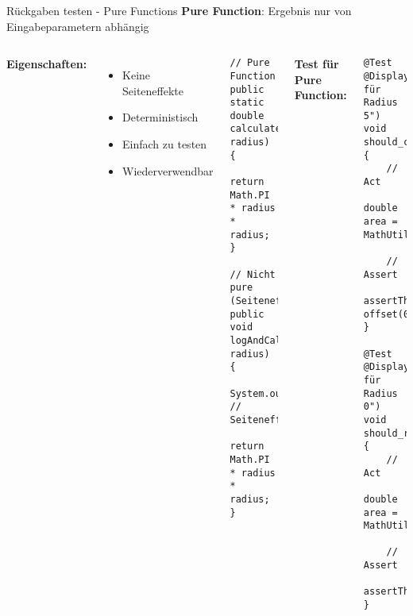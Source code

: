 \begin{frame}[fragile]{Rückgaben testen - Pure Functions}
  \textbf{Pure Function}: Ergebnis nur von Eingabeparametern abhängig

  \begin{columns}[T]
    \textbf{Eigenschaften:}
    \begin{itemize}
      \item Keine Seiteneffekte
      \item Deterministisch
      \item Einfach zu testen
      \item Wiederverwendbar
    \end{itemize}

    \begin{lstlisting}[style=java, basicstyle=\tiny\ttfamily]
// Pure Function
public static double calculateCircleArea(double radius) {
    return Math.PI * radius * radius;
}

// Nicht pure (Seiteneffekt)
public void logAndCalculate(double radius) {
    System.out.println("Calculating...");  // Seiteneffekt!
    return Math.PI * radius * radius;
}
    \end{lstlisting}

    \textbf{Test für Pure Function:}
    \begin{lstlisting}[style=java, basicstyle=\tiny\ttfamily]
@Test
@DisplayName("Kreisfläche für Radius 5")
void should_calculate_circle_area_for_radius_5() {
    // Act
    double area = MathUtils.calculateCircleArea(5.0);

    // Assert
    assertThat(area).isCloseTo(78.54, offset(0.01));
}

@Test
@DisplayName("Kreisfläche für Radius 0")
void should_return_zero_area_for_zero_radius() {
    // Act
    double area = MathUtils.calculateCircleArea(0.0);

    // Assert
    assertThat(area).isEqualTo(0.0);
}
    \end{lstlisting}
  \end{columns}
\end{frame}

